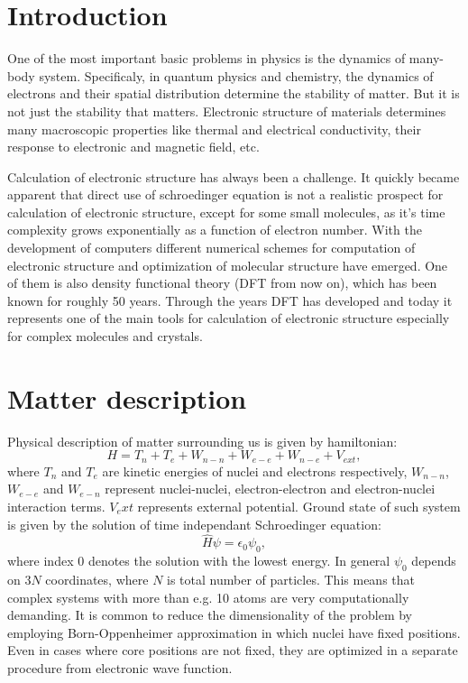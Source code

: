\documentclass[openany, longbibliography,slovene,a4paper,12pt]{article}
\begin{document}
\section{Introduction}
One of the most important basic problems in physics is the dynamics of many-body system. Specificaly, in quantum physics and chemistry, the dynamics of electrons and their spatial distribution determine the stability of matter. But it is not just the stability that matters. Electronic structure of materials determines many macroscopic properties like thermal and electrical conductivity, their response to electronic and magnetic field, etc.

Calculation of electronic structure has always been a challenge. It quickly became apparent that direct use of schroedinger equation is not a realistic prospect for calculation of electronic structure, except for some small molecules, as it's time complexity grows exponentially as a function of electron number. With the development of computers different numerical schemes for computation of electronic structure and optimization of molecular structure have emerged. One of them is also density functional theory (DFT from now on), which has been known for roughly 50 years. Through the years DFT has developed and today it represents one of the main tools for calculation of electronic structure especially for complex molecules and crystals.

\section{Matter description}
Physical description of matter surrounding us is given by hamiltonian:
\begin{equation}
H=T_n + T_e + W_{n-n} + W_{e-e} + W_{n-e} + V_{ext},
\end{equation}
where $T_n$ and $T_e$ are kinetic energies of nuclei and electrons respectively, $W_{n-n}$, $W_{e-e}$ and $W_{e-n}$ represent  nuclei-nuclei, electron-electron and electron-nuclei interaction terms. $V_ext$ represents external potential. Ground state of such system is given by the solution of time independant Schroedinger equation:
\begin{equation}
\hat H \psi = \epsilon_0 \psi_0,
\end{equation} 
where index $0$ denotes the solution with the lowest energy. In general $\psi_0$
depends on $3N$ coordinates, where $N$ is total number of particles. This means
that complex systems with more than e.g. 10 atoms are very computationally
demanding. It is common to reduce the dimensionality of the problem by employing
Born-Oppenheimer approximation in which nuclei have fixed positions.  Even in
cases where core positions are not fixed, they are optimized in a separate procedure
from electronic wave function.
\end{document}

